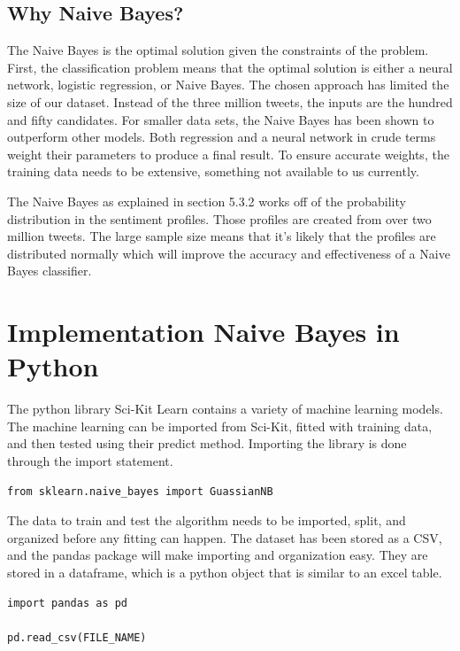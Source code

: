 \documentclass[11pt, twoside, reqno]{book}
\begin{document}
\subsection{Why Naive Bayes?}
\hspace{0.2in} The Naive Bayes is the optimal solution given the constraints of the problem. First, the classification problem means that the optimal solution is either a neural network, logistic regression, or Naive Bayes. The chosen approach has limited the size of our dataset. Instead of the three million tweets, the inputs are the hundred and fifty candidates. For smaller data sets, the Naive Bayes has been shown to outperform other models\cite{zhang2004,hand2001idiot}. Both regression and a neural network in crude terms weight their parameters to produce a final result. To ensure accurate weights, the training data needs to be extensive, something not available to us currently. 

The Naive Bayes as explained in section 5.3.2 works off of the probability distribution in the sentiment profiles. Those profiles are created from over two million tweets. The large sample size means that it's likely that the profiles are distributed normally which will improve the accuracy and effectiveness of a Naive Bayes classifier. 


\section{Implementation Naive Bayes in Python}
\hspace{0.2in}The python library Sci-Kit Learn contains a variety of machine learning models. The machine learning can be imported from Sci-Kit, fitted with training data, and then tested using their predict method. Importing the library is done through the import statement.
\begin{verbatim}
from sklearn.naive_bayes import GuassianNB
\end{verbatim}

The data to train and test the algorithm needs to be imported, split, and organized before any fitting can happen. The dataset has been stored as a CSV, and the pandas package will make importing and organization easy. They are stored in a dataframe, which is a python object that is similar to an excel table. 
\begin{verbatim}
import pandas as pd

pd.read_csv(FILE_NAME)
\end{verbatim}
\end{document}
